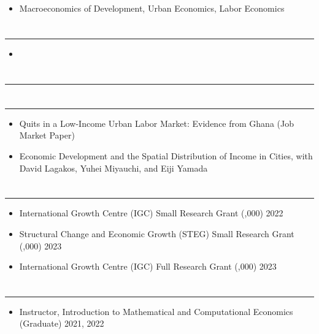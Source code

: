 \documentclass[12pt]{article}
\newenvironment{customitemize}
{ \begin{itemize}[leftmargin=\parindent, topsep = 1pt, itemsep = -1pt] }
{\end{itemize} }
\begin{document}
\begin{customitemize}
	\item Macroeconomics of Development, Urban Economics, Labor Economics
\end{customitemize}


\section*{}
\noindent \rule{\textwidth}{1pt} 
\begin{customitemize}
	\item {}
\end{customitemize}

\section*{}
\noindent \rule{\textwidth}{1pt} 

\section*{}
\noindent \rule{\textwidth}{1pt} 
\begin{customitemize}
	\item Quits in a Low-Income Urban Labor Market: Evidence from Ghana (Job Market Paper)
	\item Economic Development and the Spatial Distribution of Income in Cities, with David Lagakos, Yuhei Miyauchi, and Eiji Yamada
\end{customitemize}

\section*{}
\noindent \rule{\textwidth}{1pt} 

\begin{customitemize}
	\item International Growth Centre (IGC) Small Research Grant (,000) \hfill 2022
	\item Structural Change and Economic Growth (STEG) Small Research Grant (,000) \hfill 2023
	\item International Growth Centre (IGC) Full Research Grant (,000) \hfill 2023
\end{customitemize}

\section*{}
\noindent \rule{\textwidth}{1pt} 
\begin{customitemize}
	\item Instructor, Introduction to Mathematical and Computational Economics (Graduate) \hfill 2021, 2022
\end{customitemize}


\end{document}
